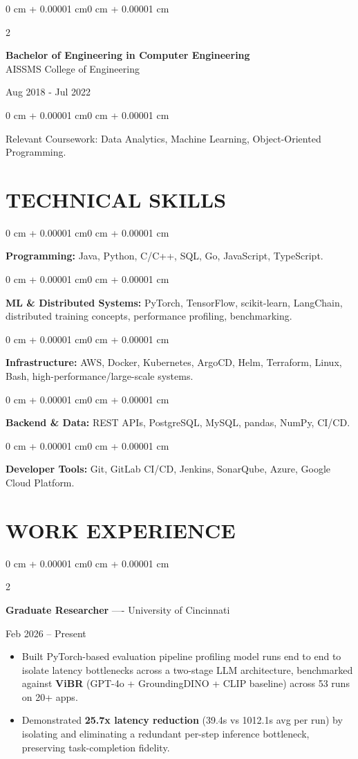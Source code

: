\documentclass[10pt, letterpaper]{article}
\newenvironment{highlights}{
    \begin{itemize}[
        topsep=0.10 cm,
        parsep=0.06 cm,
        partopsep=0pt,
        itemsep=0.06 cm,
        leftmargin=12pt
    ]
}{
    \end{itemize}
}
\newenvironment{onecolentry}{
    \begin{adjustwidth}{0 cm + 0.00001 cm}{0 cm + 0.00001 cm}
}{
    \end{adjustwidth}
}
\newenvironment{twocolentry}[2][]{
    \onecolentry
    \def\secondColumn{#2}
    \setcolumnwidth{\fill, 4.5 cm}
    \begin{paracol}{2}
}{
    \switchcolumn \raggedleft \secondColumn
    \end{paracol}
    \endonecolentry
}
\begin{document}
\begin{twocolentry}{
    Aug 2018 - Jul 2022
}
    \textbf{Bachelor of Engineering in Computer Engineering} \\
    AISSMS College of Engineering
\end{twocolentry}
\begin{onecolentry}
Relevant Coursework: Data Analytics, Machine Learning, Object-Oriented Programming.
\end{onecolentry}
\section{TECHNICAL SKILLS}
\begin{onecolentry}
\textbf{Programming:} Java, Python, C/C++, SQL, Go, JavaScript, TypeScript.
\end{onecolentry}
\vspace{0.06 cm}
\begin{onecolentry}
\textbf{ML \& Distributed Systems:} PyTorch, TensorFlow, scikit-learn, LangChain, distributed training concepts, performance profiling, benchmarking.
\end{onecolentry}
\vspace{0.06 cm}
\begin{onecolentry}
\textbf{Infrastructure:} AWS, Docker, Kubernetes, ArgoCD, Helm, Terraform, Linux, Bash, high-performance/large-scale systems.
\end{onecolentry}
\vspace{0.06 cm}
\begin{onecolentry}
\textbf{Backend \& Data:} REST APIs, PostgreSQL, MySQL, pandas, NumPy, CI/CD.
\end{onecolentry}
\vspace{0.06 cm}
\begin{onecolentry}
\textbf{Developer Tools:} Git, GitLab CI/CD, Jenkins, SonarQube, Azure, Google Cloud Platform.
\end{onecolentry}

\section{WORK EXPERIENCE}
\begin{twocolentry}{Feb 2026 -- Present}
\textbf{Graduate Researcher} ---- University of Cincinnati
\end{twocolentry}
\begin{highlights}
  \item Built PyTorch-based evaluation pipeline profiling model runs end to end to isolate latency bottlenecks across a two-stage LLM architecture, benchmarked against \textbf{ViBR} (GPT-4o + GroundingDINO + CLIP baseline) across 53 runs on 20+ apps.
  \item Demonstrated \textbf{25.7x latency reduction} (39.4s vs 1012.1s avg per run) by isolating and eliminating a redundant per-step inference bottleneck, preserving task-completion fidelity.
\end{highlights}
\end{document}
